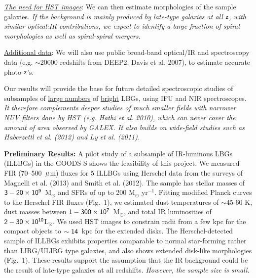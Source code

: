 \documentclass[12pt]{article}
\begin{document}
\hspace{0.1in}
\underline{\it The need for HST images}: We can then estimate morphologies of the sample galaxies. {\it If
  the background is mainly produced by late-type galaxies at all $\sf
  z$, with similar optical:IR contributions, we expect to identify a
  large fraction of spiral morphologies as well as spiral-spiral mergers.} 

\hspace{0.1in}
\underline{Additional data}: We will also use public 
broad-band optical/IR and spectroscopy data
(e.g. $\sim$20000 redshifts from DEEP2, Davis et al. 2007), 
to estimate accurate photo-$\sf z$'s.

\hspace{0.1in}
Our results will provide the base for future detailed
spectroscopic studies of subsamples of \underline{large numbers} of
\underline{bright} LBGs, using IFU and NIR spectroscopes. 
{\it It therefore complements deeper studies of much smaller fields
  with narrower NUV filters done by HST (e.g. Hathi et al. 2010),
  which can never cover the amount of area observed by GALEX.  It also
  builds on wide-field studies such as Haberzettl et al. (2012) and Ly
  et al. (2011).} 

\hspace{0.1in}
{\bf Preliminary Results:} A pilot study of a
subsample of IR-luminous LBGs (ILLBGs) in the GOODS-S shows the
feasibility of this project. We measured FIR (70--500~$\sf
\mu$m) fluxes for 5 ILLBGs using Herschel data from the surveys of Magnelli
et al. (2013) and Smith et al. (2012). The sample has
stellar masses of $\sf 3-20\times10^9$~M$_\odot$ and SFRs of
up to 200 M$_\odot$ yr$^{-1}$. Fitting modified Planck curves to the
Herschel FIR fluxes (Fig.~1), we estimated
dust temperatures of $\sim$45-60 K, dust masses between 
$\sf 1-300\times 10^7$~M$_\odot$, and total IR luminosities of
$\sf 2-30\times 10^{10}$L$_\odot$. We used HST images to
constrain radii from a few kpc for the compact objects to
$\sf \sim 14$~kpc for the extended disks. The Herschel-detected sample of 
ILLBGs exhibits properties comparable to normal star-forming 
rather than LIRG/ULIRG type galaxies, and also shows extended disk-like
morphologies (Fig.~1). These results support the
assumption that the IR background could be the result of late-type
galaxies at all redshifts. {\it However, the sample size is small.} 
\end{document}
